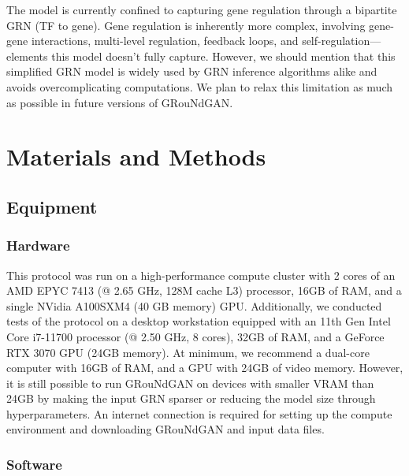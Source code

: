 The model is currently confined to capturing gene regulation through a bipartite GRN (TF to
gene). Gene regulation is inherently more complex, involving gene-gene interactions, multi-level
regulation, feedback loops, and self-regulation—elements this model doesn’t fully capture. However, we should mention that this simplified GRN model is widely used by GRN inference
algorithms alike and avoids overcomplicating computations. We plan to relax this limitation as
much as possible in future versions of GRouNdGAN.

\section*{Materials and Methods}

\subsection*{Equipment}

\subsubsection*{Hardware}

This protocol was run on a high-performance compute cluster with 2 cores of an AMD EPYC 7413
(@ 2.65 GHz, 128M cache L3) processor, 16GB of RAM, and a single NVidia A100SXM4 (40 GB
memory) GPU. Additionally, we conducted tests of the protocol on a desktop workstation
equipped with an 11th Gen Intel Core i7-11700 processor (@ 2.50 GHz, 8 cores), 32GB of RAM,
and a GeForce RTX 3070 GPU (24GB memory). At minimum, we recommend a dual-core
computer with 16GB of RAM, and a GPU with 24GB of video memory. However, it is still possible
to run GRouNdGAN on devices with smaller VRAM than 24GB by making the input GRN sparser
or reducing the model size through hyperparameters. An internet connection is required for
setting up the compute environment and downloading GRouNdGAN and input data files. 

\subsubsection*{Software}

